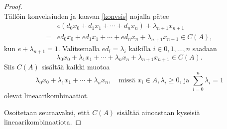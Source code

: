 \documentclass[12pt,a4paper,leqno]{report}
\theoremstyle{plain}
\theoremstyle{definition}
\theoremstyle{remark}
\begin{document}
\begin{proof}
\begin{equation*}
\end{equation*}
%
%
%
%
Tällöin konveksiuden ja kaavan \ref{konvsis} nojalla pätee 
\begin{equation*}
\begin{split}
&e(d_0 x_0+d_1 x_1+\cdots+d_{n}x_n)+\lambda_{n+1} x_{n+1}\\
=&e d_0 x_0+e d_1 x_1+\cdots+e d_{n}x_n+\lambda_{n+1} x_{n+1}
\in C(A),
\end{split}
\end{equation*}
kun $e+\lambda_{n+1} =1$. Valitsemalla $ed_i= \lambda_{i}$ kaikilla $i\in {0,1,\dots,n}$ saadaan $$\lambda_0 x_0+\lambda_1 x_1+\cdots+\lambda_{n} x_{n}+ \lambda_{n+1} x_{n+1}
\in C(A).$$ Siis $C(A)$ sisältää kaikki muotoa 
\begin{equation*}
\lambda_0 x_0+\lambda_1 x_1+\cdots+\lambda_{n} x_{n},
\quad\text{missä } x_i\in A, \lambda_i\geq0\text{, ja }
\sum_{i=0}^{n}{\lambda_i}=1
\end{equation*} 
olevat lineaarikombinaatiot. 
%
%
%
%

Osoitetaan seuraavaksi, että $C(A)$ sisältää ainoastaan kyseisiä lineaarikombinaatiota. 

\end{proof}
\end{document}
